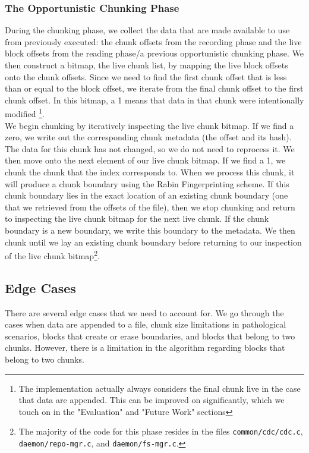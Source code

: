 \documentclass[table]{article}
\newcommand{\code}[1]{\texttt{#1}}
\begin{document}
\begin{multicols}{2}
\subsubsection{The Opportunistic Chunking Phase}

During the chunking phase, we collect the data that are made available to use from previously executed: the chunk offsets from the recording phase and the live block offsets from the reading phase/a previous opportunistic chunking phase. We then construct a bitmap, the live chunk list, by mapping the live block offsets onto the chunk offsets. Since we need to find the first chunk offset that is less than or equal to the block offset, we iterate from the final chunk offset to the first chunk offset. In this bitmap, a 1 means that data in that chunk were intentionally modified \footnote{The implementation actually always considers the final chunk live in the case that data are appended. This can be improved on significantly, which we touch on in the "Evaluation" and "Future Work" sections}.\\

We begin chunking by iteratively inspecting the live chunk bitmap. If we find a zero, we write out the corresponding chunk metadata (the offset and its hash). The data for this chunk has not changed, so we do not need to reprocess it. We then move onto the next element of our live chunk bitmap. If we find a 1, we chunk the chunk that the index corresponds to. When we process this chunk, it will produce a chunk boundary using the Rabin Fingerprinting scheme. If this chunk boundary lies in the exact location of an existing chunk boundary (one that we retrieved from the offsets of the file), then we stop chunking and return to inspecting the live chunk bitmap for the next live chunk. If the chunk boundary is a new boundary, we write this boundary to the metadata. We then chunk until we lay an existing chunk boundary before returning to our inspection of the live chunk bitmap\footnote{The majority of the code for this phase resides in the files \code{common/cdc/cdc.c}, \code{daemon/repo-mgr.c}, and \code{daemon/fs-mgr.c}.}.

\subsection{Edge Cases}

There are several edge cases that we need to account for. We go through the cases when data are appended to a file, chunk size limitations in pathological scenarios, blocks that create or erase boundaries, and blocks that belong to two chunks. However, there is a limitation in the algorithm regarding blocks that belong to two chunks.


\end{multicols}
\end{document}
